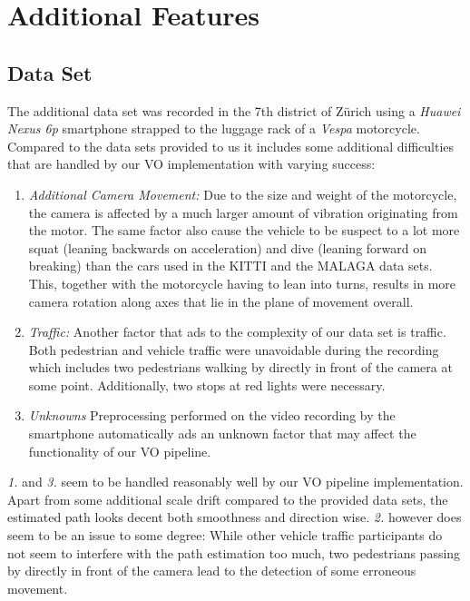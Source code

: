 \chapter{Additional Features}
\section{Data Set}
\label{dataset}

The additional data set was recorded in the 7th district of Zürich using a \emph{Huawei Nexus 6p} smartphone strapped to the luggage rack of a \emph{Vespa} motorcycle. Compared to the data sets provided to us it includes some additional difficulties that are handled by our VO implementation with varying success:\\

\begin{enumerate}
\item \emph{Additional Camera Movement:} Due to the size and weight of the motorcycle, the camera is affected by a much larger amount of vibration originating from the motor. The same factor also cause the vehicle to be suspect to a lot more squat (leaning backwards on acceleration) and dive (leaning forward on breaking) than the cars used in the KITTI and the MALAGA data sets. This, together with the motorcycle having to lean into turns, results in more camera rotation along axes that lie in the plane of movement overall.

\item \emph{Traffic:} Another factor that ads to the complexity of our data set is traffic. Both pedestrian and vehicle traffic were unavoidable during the recording which includes two pedestrians walking by directly in front of the camera at some point. Additionally, two stops at red lights were necessary.

\item \emph{Unknowns} Preprocessing performed on the video recording by the smartphone automatically ads an unknown factor that may affect the functionality of our VO pipeline.
\end{enumerate}

\emph{1.} and \emph{3.} seem to be handled reasonably well by our VO pipeline implementation. Apart from some additional scale drift compared to the provided data sets, the estimated path looks decent both smoothness and direction wise. \emph{2.} however does seem to be an issue to some degree: While other vehicle traffic participants do not seem to interfere with the path estimation too much, two pedestrians passing by directly in front of the camera lead to the detection of some erroneous movement.


